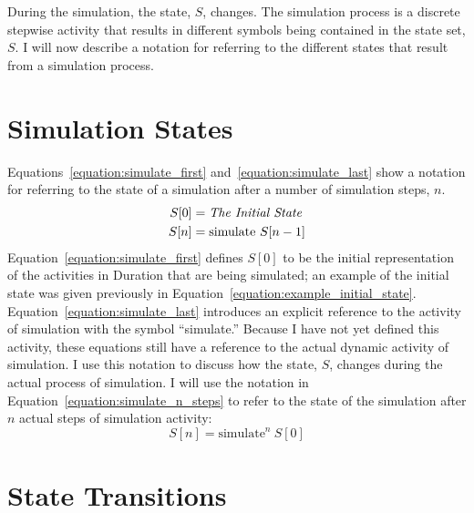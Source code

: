 During the simulation, the state, $S$, changes.  The
simulation process is a discrete stepwise activity that results in
different symbols being contained in the state set, $S$.  I
will now describe a notation for referring to the different states
that result from a simulation process.

\section{Simulation States}

Equations~\ref{equation:simulate_first}
and~\ref{equation:simulate_last} show a notation for referring to the
state of a simulation after a number of simulation steps, $n$.
\begin{align}
\label{equation:simulate_first}
S[0] &= \text{\emph{The Initial State}} \\
\label{equation:simulate_last}
S[n] &= \text{simulate}~S[n-1]
\end{align}
Equation~\ref{equation:simulate_first} defines $S[0]$ to be
the initial representation of the activities in Duration that are
being simulated; an example of the initial state was given previously
in Equation~\ref{equation:example_initial_state}.
Equation~\ref{equation:simulate_last} introduces an explicit reference
to the activity of simulation with the symbol ``simulate.''  Because I
have not yet defined this activity, these equations still have a
reference to the actual dynamic activity of simulation.  I use this
notation to discuss how the state, $S$, changes during the
actual process of simulation.  I will use the notation in
Equation~\ref{equation:simulate_n_steps} to refer to the state of the
simulation after $n$ actual steps of simulation activity:
\begin{equation}
\label{equation:simulate_n_steps}
S[n] = \text{simulate}^n~S[0]
\end{equation}

\section{State Transitions}

